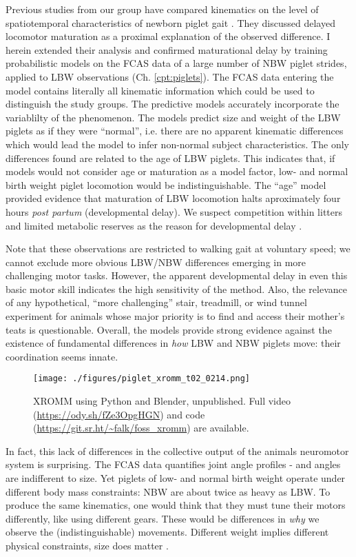 Previous studies from our group have compared kinematics on the level of spatiotemporal characteristics of newborn piglet gait \citep{VandenHole2018}.
They discussed delayed locomotor maturation as a proximal explanation of the observed difference.
I herein extended their analysis and confirmed maturational delay by training probabilistic models on the FCAS data of a large number of NBW piglet strides, applied to LBW observations (Ch. \ref{cpt:piglets}).
The FCAS data entering the model contains literally all kinematic information which could be used to distinguish the study groups.
The predictive models accurately incorporate the variablilty of the phenomenon.
The models predict size and weight of the LBW piglets as if they were ``normal'', i.e. there are no apparent kinematic differences which would lead the model to infer non-normal subject characteristics.
The only differences found are related to the age of LBW piglets.
This indicates that, if models would not consider age or maturation as a model factor, low- and normal birth weight piglet locomotion would be indistinguishable.
The ``age'' model provided evidence that maturation of LBW locomotion halts aproximately four hours \emph{post partum} (developmental delay).
We suspect competition within litters and limited metabolic reserves as the reason for developmental delay \citep{VandenHole2019}.

Note that these observations are restricted to walking gait at voluntary speed; we cannot exclude more obvious LBW/NBW differences emerging in more challenging motor tasks.
However, the apparent developmental delay in even this basic motor skill indicates the high sensitivity of the method.
Also, the relevance of any hypothetical, ``more challenging'' stair, treadmill, or wind tunnel experiment for animals whose major priority is to find and access their mother's teats is questionable.
Overall, the models provide strong evidence against the existence of fundamental differences in \emph{how} LBW and NBW piglets move: their coordination seems innate.



\begin{figure}[p]
\centering
\texttt{[image: ./figures/piglet\_xromm\_t02\_0214.png]}
\caption{\label{fig:piglet_xromm}XROMM using Python and Blender, unpublished. Full video (\url{https://ody.sh/fZe3OpgHGN}) and code (\url{https://git.sr.ht/\~falk/foss\_xromm}) are available.}
\end{figure}

In fact, this lack of differences in the collective output of the animals neuromotor system is surprising.
The FCAS data quantifies joint angle profiles - and angles are indifferent to size.
Yet piglets of low- and normal birth weight operate under different body mass constraints: NBW are about twice as heavy as LBW.
To produce the same kinematics, one would think that they must tune their motors differently, like using different gears.
These would be differences in \emph{why} we observe the (indistinguishable) movements.
Different weight implies different physical constraints, size does matter \citep{Aerts2023}.

